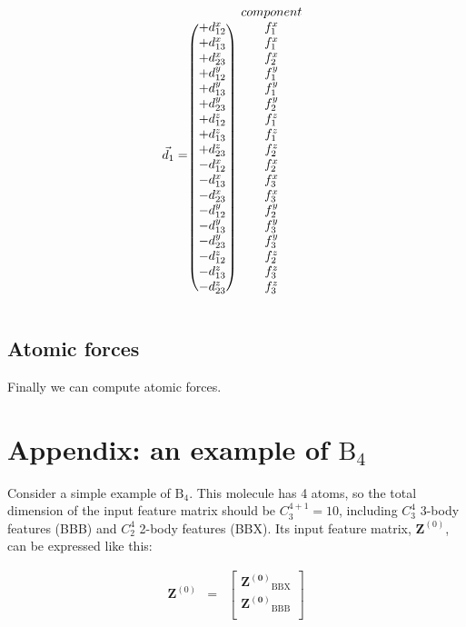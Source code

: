 \documentclass{article}
\begin{document}
\begin{equation}
\vec{d}_{1} = \begin{blockarray}{cc}
              & component \\
\begin{block}{(c)c}
	+d^x_{12} & f^x_1 \\
	+d^x_{13} & f^x_1 \\
	+d^x_{23} & f^x_2 \\
	+d^y_{12} & f^y_1 \\
	+d^y_{13} & f^y_1 \\
	+d^y_{23} & f^y_2 \\
	+d^z_{12} & f^z_1 \\
	+d^z_{13} & f^z_1 \\
	+d^z_{23} & f^z_2 \\
	-d^x_{12} & f^x_2 \\
	-d^x_{13} & f^x_3 \\
	-d^x_{23} & f^x_3 \\
	-d^y_{12} & f^y_2 \\
	-d^y_{13} & f^y_3 \\
	-d^y_{23} & f^y_3 \\
	-d^z_{12} & f^z_2 \\
	-d^z_{13} & f^z_3 \\
	-d^z_{23} & f^z_3 \\
\end{block}
\end{blockarray}
\end{equation}

\subsection{Atomic forces}

Finally we can compute atomic forces.



\newpage

\section*{Appendix: an example of $\mathrm{B}_4$}

Consider a simple example of $\mathrm{B}_{4}$. This molecule has 4 atoms, so the total 
dimension of the input feature matrix should be $C^{4+1}_3=10$, including $C^4_3$ 3-body 
features (BBB) and $C^4_2$ 2-body features (BBX).
Its input feature matrix, $\mathbf{Z}^{(0)}$, can be expressed like this:

\begin{eqnarray}
\mathbf{Z}^{(0)} & = & \left[\begin{array}{c}
	\mathbf{Z^{(0)}}_{\mathrm{BBX}} \\
	\mathbf{Z^{(0)}}_{\mathrm{BBB}} \\
\end{array}
\right]
\end{eqnarray}
\end{document}
